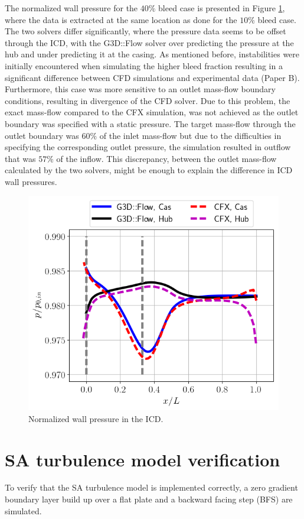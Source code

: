 The normalized wall pressure for the $40\%$ bleed case is presented in Figure \ref{fig:duct40}, where the data is extracted at the same location as done for the $10\%$ bleed case. The two solvers differ significantly, where the pressure data seems to be offset through the ICD, with the G3D::Flow solver over predicting the pressure at the hub and under predicting it at the casing. As mentioned before, instabilities were initially encountered when simulating the higher bleed fraction resulting in a significant difference between CFD simulations and experimental data (Paper B). Furthermore, this case was more sensitive to an outlet mass-flow boundary conditions, resulting in divergence of the CFD solver. Due to this problem, the exact mass-flow compared to the CFX simulation, was not achieved as the outlet boundary was specified with a static pressure. The target mass-flow through the outlet boundary was $60\%$ of the inlet mass-flow but due to the difficulties in specifying the corresponding outlet pressure, the simulation resulted in outflow that was $57\%$ of the inflow. This discrepancy, between the outlet mass-flow calculated by the two solvers, might be enough to explain the difference in ICD wall pressures.
\begin{figure}[h!]
  \centering
  \includegraphics[width=.6\textwidth]{figures/CFXG3dDuct40.png}
    \caption{Normalized wall pressure in the ICD.} \label{fig:duct40}
\end{figure}

%           
\chapter{SA turbulence model verification\label{ch:verification}}
To verify that the SA turbulence model is implemented correctly, a zero gradient boundary layer build up over a flat plate and a backward facing step (BFS) are simulated. 

